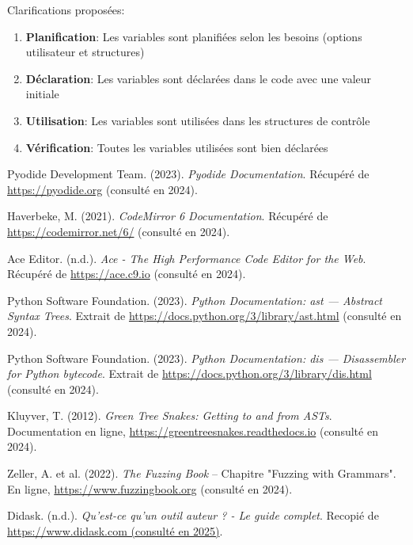 \documentclass[11pt,a4paper]{article}
\begin{document}
Clarifications proposées:

\begin{enumerate}
    \item \textbf{Planification}: Les variables sont planifiées selon les besoins (options utilisateur et structures)
    \item \textbf{Déclaration}: Les variables sont déclarées dans le code avec une valeur initiale
    \item \textbf{Utilisation}: Les variables sont utilisées dans les structures de contrôle
    \item \textbf{Vérification}: Toutes les variables utilisées sont bien déclarées
\end{enumerate}




\begin{thebibliography}{99}

 Pyodide Development Team. (2023). \textit{Pyodide Documentation}. Récupéré de \url{https://pyodide.org} (consulté en 2024).

 Haverbeke, M. (2021). \textit{CodeMirror 6 Documentation}. Récupéré de \url{https://codemirror.net/6/} (consulté en 2024).

 Ace Editor. (n.d.). \textit{Ace - The High Performance Code Editor for the Web}. Récupéré de \url{https://ace.c9.io} (consulté en 2024).

 Python Software Foundation. (2023). \textit{Python Documentation: ast --- Abstract Syntax Trees}. Extrait de \url{https://docs.python.org/3/library/ast.html} (consulté en 2024).

 Python Software Foundation. (2023). \textit{Python Documentation: dis --- Disassembler for Python bytecode}. Extrait de \url{https://docs.python.org/3/library/dis.html} (consulté en 2024).

 Kluyver, T. (2012). \textit{Green Tree Snakes: Getting to and from ASTs}. Documentation en ligne, \url{https://greentreesnakes.readthedocs.io} (consulté en 2024).

 Zeller, A. et al. (2022). \textit{The Fuzzing Book} – Chapitre "Fuzzing with Grammars". En ligne, \url{https://www.fuzzingbook.org} (consulté en 2024).

 Didask. (n.d.). \textit{Qu'est-ce qu'un outil auteur ? - Le guide complet}. Recopié de \url{https://www.didask.com (consulté en 2025)}.


\end{thebibliography}
\end{document}
